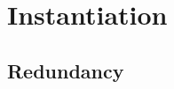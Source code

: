 \documentclass[%
handout,
]{beamer}
\begin{document}






\section{Instantiation}
\subsection{Redundancy}
\end{document}
